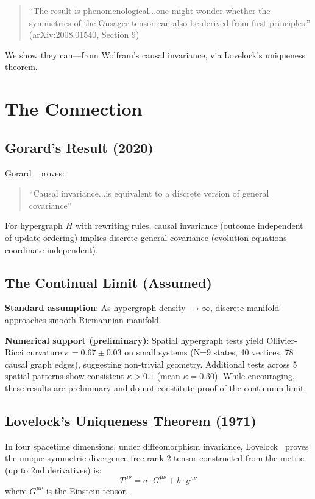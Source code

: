 \documentclass[11pt]{article}
\begin{document}
\begin{quote}
``The result is phenomenological...one might wonder whether the symmetries of the Onsager tensor can also be derived from first principles.'' (arXiv:2008.01540, Section 9)
\end{quote}

We show they can---from Wolfram's causal invariance, via Lovelock's uniqueness theorem.

\section{The Connection}

\subsection{Gorard's Result (2020)}

Gorard~\cite{Gorard2020} proves:

\begin{quote}
``Causal invariance...is equivalent to a discrete version of general covariance''
\end{quote}

For hypergraph $H$ with rewriting rules, causal invariance (outcome independent of update ordering) implies discrete general covariance (evolution equations coordinate-independent).

\subsection{The Continual Limit (Assumed)}

\textbf{Standard assumption}: As hypergraph density $\to \infty$, discrete manifold approaches smooth Riemannian manifold.

\textbf{Numerical support (preliminary)}: Spatial hypergraph tests yield Ollivier-Ricci curvature $\kappa=0.67\pm0.03$ on small systems (N=9 states, 40 vertices, 78 causal graph edges), suggesting non-trivial geometry. Additional tests across 5 spatial patterns show consistent $\kappa>0.1$ (mean $\kappa=0.30$). While encouraging, these results are preliminary and do not constitute proof of the continuum limit.

\subsection{Lovelock's Uniqueness Theorem (1971)}

In four spacetime dimensions, under diffeomorphism invariance, Lovelock~\cite{Lovelock1971} proves the unique symmetric divergence-free rank-2 tensor constructed from the metric (up to 2nd derivatives) is:
\begin{equation}
T^{\mu\nu} = a \cdot G^{\mu\nu} + b \cdot g^{\mu\nu}
\end{equation}
where $G^{\mu\nu}$ is the Einstein tensor.
\end{document}
